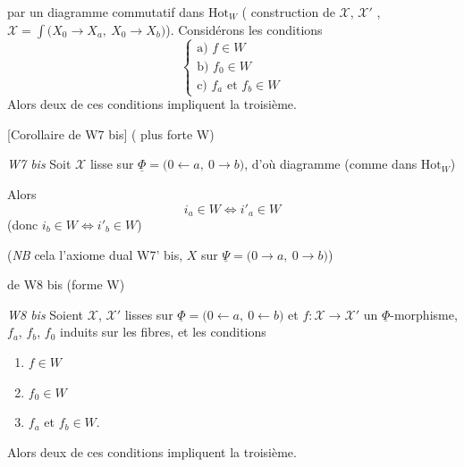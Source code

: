 \documentclass[11pt,a4paper]{article}
\begin{document}

 par un diagramme commutatif dans $\mathrm{Hot}_{W}$ ( construction de $\mathcal{X}$, $\mathcal{X}'$ , $\mathcal{X} = \int\bigl(X_0 \to X_a,\ X_0 \to X_b\bigr)$). Considérons les conditions
\[
  \left\{
  \begin{array}{l}
  \text{a) } f \in W \\
  \text{b) } f_0 \in W \\
  \text{c) } f_a \text{ et } f_b \in W
  \end{array}
  \right.
\]
Alors deux de ces conditions impliquent la troisième.

 [Corollaire de W7 bis] ( plus forte \ill{} W\ill{})

\emph{W7 bis} Soit $\mathcal{X}$ lisse sur $\underline{\Phi} = \bigl(0 \leftarrow a,\ 0 \to b\bigr)$, d'où diagramme (comme dans $\mathrm{Hot}_{W}$)


Alors
\[
  i_a \in W \Longleftrightarrow i'_a \in W
\]
(donc $i_b \in W \Longleftrightarrow i'_b \in W$)

(\emph{NB} cela  l'axiome dual W7' bis,  $X$  sur $\underline{\Psi} = \bigl(0 \to a,\ 0 \to b\bigr)$)

 de W8 bis (forme  \ill{} W\ill{})

\emph{W8 bis} Soient $\mathcal{X}$, $\mathcal{X}'$ lisses sur $\underline{\Phi} = \bigl(0 \leftarrow a,\ 0 \leftarrow b\bigr)$ et $f : \mathcal{X} \to \mathcal{X}'$ un $\underline{\Phi}$-morphisme,  $f_a$, $f_b$, $f_0$ induits sur les fibres, et les conditions
\begin{enumerate}
  \item[a)] $f \in W$
  \item[b)] $f_0 \in W$
  \item[c)] $f_a$ et $f_b \in W$.
\end{enumerate}
Alors deux de ces conditions impliquent la troisième.
\end{document}
